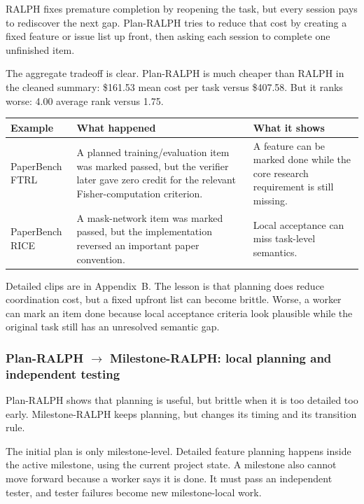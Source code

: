 \documentclass[11pt,a4paper]{article}
\renewcommand{\arraystretch}{1.18}
\newcommand{\code}[1]{#1}
\begin{document}
RALPH fixes premature completion by reopening the task, but every session pays to rediscover the next gap. Plan-RALPH tries to reduce that cost by creating a fixed feature or issue list up front, then asking each session to complete one unfinished item.

The aggregate tradeoff is clear. Plan-RALPH is much cheaper than RALPH in the cleaned summary: \code{\$161.53} mean cost per task versus \code{\$407.58}. But it ranks worse: \code{4.00} average rank versus \code{1.75}.

\begingroup
\renewcommand{\arraystretch}{1.25}
\setlength{\tabcolsep}{6pt}
\footnotesize
\noindent\begin{tabular}{@{}p{2.6cm}p{6.5cm}p{5.5cm}@{}}
\toprule
\rowcolor{tablehead}\textbf{\color{white}Example} & \textbf{\color{white}What happened} & \textbf{\color{white}What it shows} \\
\midrule
\code{PaperBench FTRL} & A planned training/evaluation item was marked passed, but the verifier later gave zero credit for the relevant Fisher-computation criterion. & A feature can be marked done while the core research requirement is still missing. \\
\rowcolor{tableband}
\code{PaperBench RICE} & A mask-network item was marked passed, but the implementation reversed an important paper convention. & Local acceptance can miss task-level semantics. \\
\bottomrule
\end{tabular}
\endgroup

\vspace{6pt}

Detailed clips are in Appendix~B. The lesson is that planning does reduce coordination cost, but a fixed upfront list can become brittle. Worse, a worker can mark an item done because local acceptance criteria look plausible while the original task still has an unresolved semantic gap.

\subsubsection{Plan-RALPH $\rightarrow$ Milestone-RALPH: local planning and independent testing}

Plan-RALPH shows that planning is useful, but brittle when it is too detailed too early. Milestone-RALPH keeps planning, but changes its timing and its transition rule.

The initial plan is only milestone-level. Detailed feature planning happens inside the active milestone, using the current project state. A milestone also cannot move forward because a worker says it is done. It must pass an independent tester, and tester failures become new milestone-local work.
\end{document}
